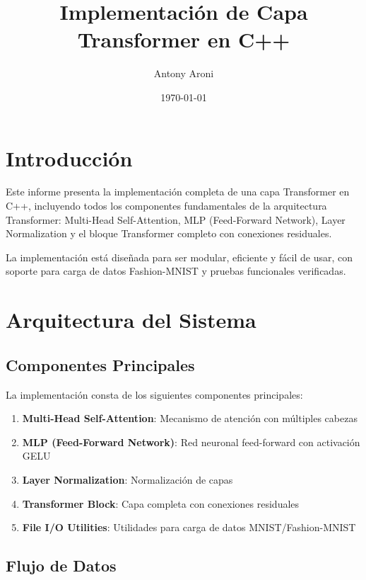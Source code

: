 \documentclass[12pt,a4paper]{article}
\title{\textbf{Implementación de Capa Transformer en C++}}
\author{Antony Aroni}
\date{\today}
\begin{document}
\maketitle

\tableofcontents
\newpage

\section{Introducción}

Este informe presenta la implementación completa de una capa Transformer en C++, incluyendo todos los componentes fundamentales de la arquitectura Transformer: Multi-Head Self-Attention, MLP (Feed-Forward Network), Layer Normalization y el bloque Transformer completo con conexiones residuales.

La implementación está diseñada para ser modular, eficiente y fácil de usar, con soporte para carga de datos Fashion-MNIST y pruebas funcionales verificadas.

\section{Arquitectura del Sistema}

\subsection{Componentes Principales}

La implementación consta de los siguientes componentes principales:

\begin{enumerate}
    \item \textbf{Multi-Head Self-Attention}: Mecanismo de atención con múltiples cabezas
    \item \textbf{MLP (Feed-Forward Network)}: Red neuronal feed-forward con activación GELU
    \item \textbf{Layer Normalization}: Normalización de capas
    \item \textbf{Transformer Block}: Capa completa con conexiones residuales
    \item \textbf{File I/O Utilities}: Utilidades para carga de datos MNIST/Fashion-MNIST
\end{enumerate}

\subsection{Flujo de Datos}
\end{document}
